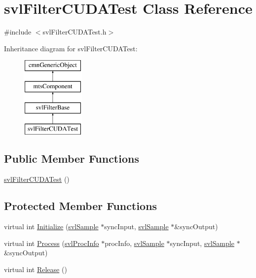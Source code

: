 \hypertarget{classsvl_filter_c_u_d_a_test}{}\section{svl\+Filter\+C\+U\+D\+A\+Test Class Reference}
\label{classsvl_filter_c_u_d_a_test}


{\ttfamily \#include $<$svl\+Filter\+C\+U\+D\+A\+Test.\+h$>$}

Inheritance diagram for svl\+Filter\+C\+U\+D\+A\+Test\+:\begin{figure}[H]
\begin{center}
\leavevmode
\includegraphics[height=4.000000cm]{da/da7/classsvl_filter_c_u_d_a_test}
\end{center}
\end{figure}
\subsection*{Public Member Functions}
\begin{DoxyCompactItemize}
\item 
\hyperlink{classsvl_filter_c_u_d_a_test_adfe2f7dd78695560be1f5a0441392803}{svl\+Filter\+C\+U\+D\+A\+Test} ()
\end{DoxyCompactItemize}
\subsection*{Protected Member Functions}
\begin{DoxyCompactItemize}
\item 
virtual int \hyperlink{classsvl_filter_c_u_d_a_test_a7b56add38b42d1068f495e4a9439e311}{Initialize} (\hyperlink{classsvl_sample}{svl\+Sample} $\ast$sync\+Input, \hyperlink{classsvl_sample}{svl\+Sample} $\ast$\&sync\+Output)
\item 
virtual int \hyperlink{classsvl_filter_c_u_d_a_test_a23f33ea377f17aae304abee9369f75e7}{Process} (\hyperlink{structsvl_proc_info}{svl\+Proc\+Info} $\ast$proc\+Info, \hyperlink{classsvl_sample}{svl\+Sample} $\ast$sync\+Input, \hyperlink{classsvl_sample}{svl\+Sample} $\ast$\&sync\+Output)
\item 
virtual int \hyperlink{classsvl_filter_c_u_d_a_test_a1860a87c1a330c9067c9a7ead846a54f}{Release} ()
\end{DoxyCompactItemize}
